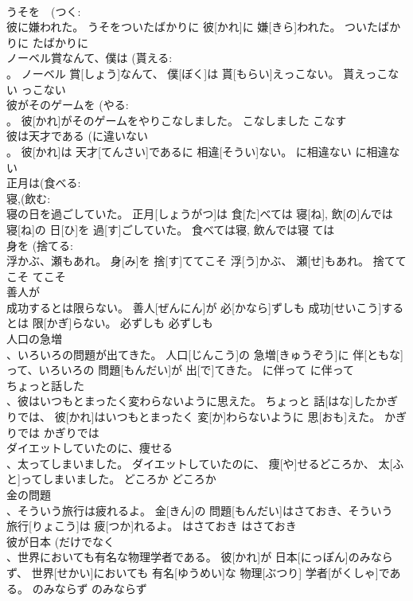 \documentclass[8pt]{extreport}
\begin{document}
\begin{CJK}{UTF8}{min}
\\	うそを　(つく: 
\\	彼に嫌われた。	うそをついたばかりに 彼[かれ]に 嫌[きら]われた。	ついたばかりに	たばかりに	
\\	ノーベル賞なんて、僕は (貰える: 
\\	。	ノーベル 賞[しょう]なんて、 僕[ぼく]は 貰[もらい]えっこない。	貰えっこない	っこない	
\\	彼がそのゲームを (やる: 
\\	。	彼[かれ]がそのゲームをやりこなしました。	こなしました	こなす	
\\	彼は天才である (に違いない 
\\	。	彼[かれ]は 天才[てんさい]であるに 相違[そうい]ない。	に相違ない	に相違ない	
\\	正月は(食べる: 
\\	寝,(飲む: 
\\	寝の日を過ごしていた。	正月[しょうがつ]は 食[た]べては 寝[ね], 飲[の]んでは 寝[ね]の 日[ひ]を 過[す]ごしていた。	食べては寝, 飲んでは寝	ては	
\\	身を (捨てる: 
\\	浮かぶ、瀬もあれ。	身[み]を 捨[す]ててこそ 浮[う]かぶ、 瀬[せ]もあれ。	捨ててこそ	てこそ	
\\	善人が 
\\	成功するとは限らない。	善人[ぜんにん]が 必[かなら]ずしも 成功[せいこう]するとは 限[かぎ]らない。	必ずしも	必ずしも	
\\	人口の急増 
\\	、いろいろの問題が出てきた。	人口[じんこう]の 急増[きゅうぞう]に 伴[ともな]って、いろいろの 問題[もんだい]が 出[で]てきた。	に伴って	に伴って	
\\	ちょっと話した 
\\	、彼はいつもとまったく変わらないように思えた。	ちょっと 話[はな]したかぎりでは、 彼[かれ]はいつもとまったく 変[か]わらないように 思[おも]えた。	かぎりでは	かぎりでは	
\\	ダイエットしていたのに、痩せる 
\\	、太ってしまいました。	ダイエットしていたのに、 痩[や]せるどころか、 太[ふと]ってしまいました。	どころか	どころか	
\\	金の問題 
\\	、そういう旅行は疲れるよ。	金[きん]の 問題[もんだい]はさておき、そういう 旅行[りょこう]は 疲[つか]れるよ。	はさておき	はさておき	
\\	彼が日本 (だけでなく 
\\	、世界においても有名な物理学者である。	彼[かれ]が 日本[にっぽん]のみならず、 世界[せかい]においても 有名[ゆうめい]な 物理[ぶつり] 学者[がくしゃ]である。	のみならず	のみならず	

\end{CJK}
\end{document}
